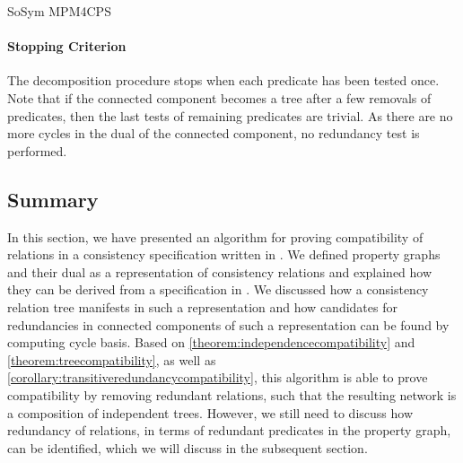\begin{copiedFrom}{SoSym MPM4CPS}
\paragraph{Stopping Criterion}
 The decomposition procedure stops when each predicate has been tested once. Note that if the connected component becomes a tree after a few removals of predicates, then the last tests of remaining predicates are trivial. As there are no more cycles in the dual of the connected component, no redundancy test is performed.

\subsection{Summary}
In this section, we have presented an algorithm for proving compatibility of relations in a consistency specification written in \qvtr.
We defined property graphs and their dual as a representation of consistency relations and explained how they can be derived from a specification in \qvtr.
We discussed how a consistency relation tree manifests in such a representation and how candidates for redundancies in connected components of such a representation can be found by computing cycle basis.
Based on \autoref{theorem:independencecompatibility} and \autoref{theorem:treecompatibility}, as well as \autoref{corollary:transitiveredundancycompatibility}, this algorithm is able to prove compatibility by removing redundant relations, such that the resulting network is a composition of independent trees.
However, we still need to discuss how redundancy of relations, in terms of redundant predicates in the property graph, can be identified, which we will discuss in the subsequent section.



\end{copiedFrom}
